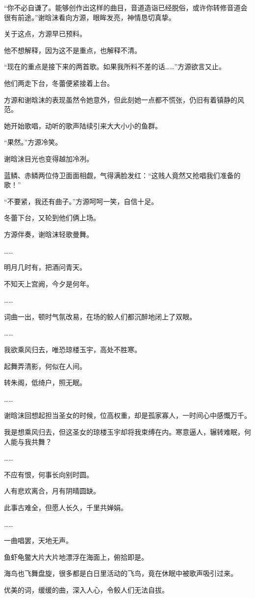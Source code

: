 \begin{this_body}
“你不必自谦了。能够创作出这样的曲目，音道造诣已经脱俗，或许你转修音道会很有前途。”谢晗沫看向方源，眼眸发亮，神情恳切真挚。

关于这点，方源早已预料。

他不想解释，因为这不是重点，也解释不清。

“现在的重点是接下来的两首歌。如果我所料不差的话……”方源欲言又止。

他们两走下台，冬蕾便紧接着上台。

方源和谢晗沫的表现虽然令她意外，但此刻她一点都不慌张，仍旧有着镇静的风范。

她开始歌唱，动听的歌声陆续引来大大小小的鱼群。

“果然。”方源冷笑。

谢晗沫目光也变得越加冷冽。

蓝鳞、赤鳞两位侍卫面面相觑，气得满脸发红：“这贱人竟然又抢唱我们准备的歌！”

“不要紧，我还有曲子。”方源呵呵一笑，自信十足。

冬蕾下台，又轮到他们俩上场。

方源伴奏，谢晗沫轻歌曼舞。

……

明月几时有，把酒问青天。

不知天上宫阙，今夕是何年。

……

词曲一出，顿时气氛改易，在场的鲛人们都沉醉地闭上了双眼。

……

我欲乘风归去，唯恐琼楼玉宇，高处不胜寒。

起舞弄清影，何似在人间。

转朱阁，低绮户，照无眠。

……

谢晗沫回想起担当圣女的时候，位高权重，却是孤家寡人，一时间心中感慨万千。

我是想乘风归去，但这圣女的琼楼玉宇却将我束缚在内。寒意逼人，辗转难眠，何人能与我共舞？

……

不应有恨，何事长向别时圆。

人有悲欢离合，月有阴晴圆缺。

此事古难全，但愿人长久，千里共婵娟。

……

一曲唱罢，天地无声。

鱼虾龟鳖大片大片地漂浮在海面上，俯拾即是。

海鸟也飞舞盘旋，很多都是白日里活动的飞鸟，竟在休眠中被歌声吸引过来。

优美的词，缓缓的曲，深入人心，令鲛人们无法自拔。


\end{this_body}
